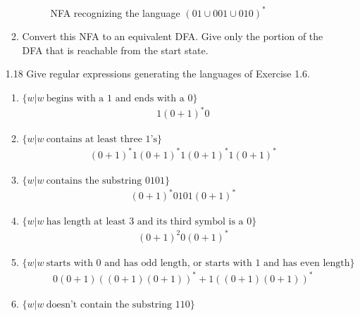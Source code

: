 \begin{enumerate}
\begin{enumerate}
\begin{figure}[H]
                        \caption{NFA recognizing the language $(01 \cup 001 \cup 010)^\ast$}
                    \end{figure}
              \item Convert this NFA to an equivalent DFA. Give only the portion of the DFA that is reachable from the start state.
          \end{enumerate}
    \item [1.18]
          Give regular expressions generating the languages of Exercise 1.6.
          \begin{enumerate}
              \item $\{w|w~ \text{begins with a }1\text{ and ends with a }0\}$
                    \begin{align*}
                        1(0+1)^*0
                    \end{align*}
              \item $\{w|w~ \text{contains at least three }1\text{'s}\}$
                    \begin{align*}
                        (0+1)^*1(0+1)^*1(0+1)^*1(0+1)^*
                    \end{align*}
              \item $\{w|w~ \text{contains the substring }0101\}$
                    \begin{align*}
                        (0+1)^*0101(0+1)^*
                    \end{align*}
              \item $\{w|w~ \text{has length at least }3\text{ and its third symbol is a }0\}$
                    \begin{align*}
                        (0+1)^{2}0(0+1)^*
                    \end{align*}
              \item $\{w|w~ \text{starts with }0\text{ and has odd length, or starts with }1\text{ and has even length}\}$
                    \begin{align*}
                        0(0+1)((0+1)(0+1))^* + 1((0+1)(0+1))^*
                    \end{align*}
              \item $\{w|w~ \text{doesn't contain the substring }110\}$

\end{enumerate}
\end{enumerate}
